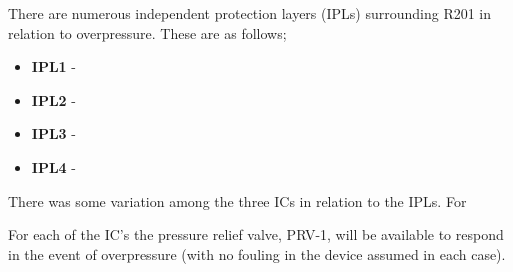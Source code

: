  There are numerous  independent protection layers (IPLs) surrounding R201 in relation to overpressure. These are as follows;
 
 \begin{itemize}
\item  \textbf{IPL1} - 
\item  \textbf{IPL2} -
\item  \textbf{IPL3} -
\item  \textbf{IPL4} - 
 \end{itemize}



 
 
There was some variation among the three ICs in relation to the IPLs. For 





For each of the IC's the pressure relief valve, PRV-1, will be available to respond in the event of overpressure (with no fouling in the device assumed in each case). 





 
